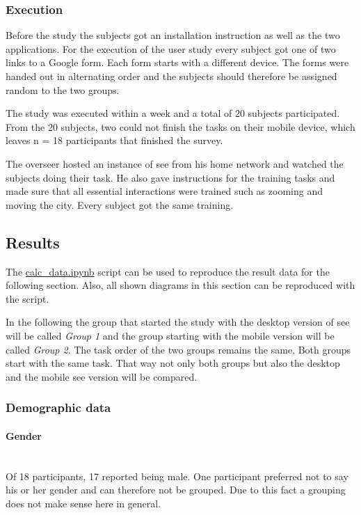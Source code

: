 \subsubsection{Execution}
Before the study the subjects got an installation instruction as well as the two applications.
For the execution of the user study every subject got one of two links to a Google form.
Each form starts with a different device. 
The forms were handed out in alternating order and the subjects should therefore be assigned random to the two groups.

The study was executed within a week and a total of 20 subjects participated.
From the 20 subjects, two could not finish the tasks on their mobile device, which leaves n = 18 participants that finished the survey.

The overseer hosted an instance of \gls{see} from his home network and watched the subjects doing their task.
He also gave instructions for the training tasks and made sure that all essential interactions were trained such as zooming and moving the \gls{city}.
Every subject got the same training.
\subsection{Results}
The \hyperref[calc]{calc\_data.ipynb} script can be used to reproduce the result data for the following section.
Also, all shown diagrams in this section can be reproduced with the script.

In the following the group that started the study with the desktop version of \gls{see} will be called \textit{Group 1} and the group starting with the mobile version will be called \textit{Group 2}.
The task order of the two groups remains the same.
Both groups start with the same task.
That way not only both groups but also the desktop and the mobile \gls{see} version will be compared. 

\label{results}
\subsubsection{Demographic data}
\paragraph{Gender}\mbox{}\\
Of 18 participants, 17 reported being male. 
One participant preferred not to say his or her gender and can therefore not be grouped.
Due to this fact a grouping does not make sense here in general. 

